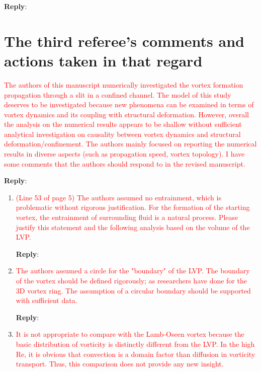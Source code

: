 \documentclass[onecolumn,a4paper,amsmath,amssym,pre]{revtex4}
\begin{document}
{\begin{enumerate}
{	\textbf{Reply}:
	
	
}
\end{enumerate}


\newpage

\section*{The third referee's comments and actions taken in that regard} 

  
\textcolor{red}{The authors of this manuscript numerically investigated the vortex formation propagation through a slit in a confined channel. The model of this study deserves to be investigated because new phenomena can be examined in terms of vortex dynamics and its coupling with structural deformation. However, overall the analysis on the numerical results appears to be shallow without sufficient analytical investigation on causality between vortex dynamics and structural deformation/confinement. The authors mainly focused on reporting the numerical results in diverse aspects (such as propagation speed, vortex topology). I have some comments that the authors should respond to in the revised manuscript.}


\textbf{Reply}:

\begin{enumerate}

	\item \textcolor{red}{(Line 53 of page 5) The authors assumed no entrainment, which is problematic without rigorous justification. For the formation of the starting vortex, the entrainment of surrounding fluid is a natural process. Please justify this statement and the following analysis based on the volume of the LVP.}
	
	\textbf{Reply}:
	
	\item \textcolor{red}{The authors assumed a circle for the "boundary" of the LVP. The boundary of the vortex should be defined rigorously; as researchers have done for the 3D vortex ring. The assumption of a circular boundary should be supported with sufficient data.}
	
	\textbf{Reply}:
	
	\item \textcolor{red}{It is not appropriate to compare with the Lamb-Oseen vortex because the basic distribution of vorticity is distinctly different from the LVP. In the high Re, it is obvious that convection is a domain factor than diffusion in vorticity transport. Thus, this comparison does not provide any new insight.}
	

\end{enumerate}}
\end{document}

